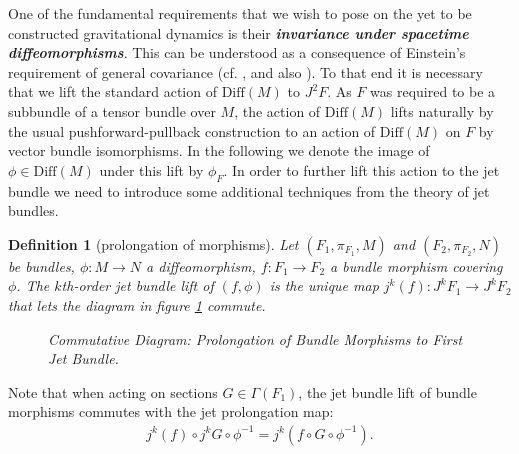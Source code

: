 \documentclass[%
 reprint,
nofootinbib,
 amsmath,amssymb,
 aps,
 prd,
floatfix,
]{revtex4-2}
\newtheorem{definition}{Definition}
\begin{document}
One of the fundamental requirements that we wish to pose on the yet to be constructed gravitational dynamics is their \textit{\textbf{invariance under spacetime diffeomorphisms}}. 
This can be understood as a consequence of Einstein's requirement of general covariance (cf. \cite{Stachel1993-STATMO-5}, \cite{Pooley} and also \cite{Norton1993-NORGCA}).
To that end it is necessary that we lift the standard action of $\mathrm{Diff}(M)$ to $J^2F$.
As $F$ was required to be a subbundle of a tensor bundle over $M$, the action of $\mathrm{Diff}(M)$ lifts naturally by the usual pushforward-pullback construction to an action of $\mathrm{Diff}(M)$ on $F$ by vector bundle isomorphisms.
In the following we denote the image of $\phi \in \mathrm{Diff}(M)$ under this lift by $\phi_F$.
In order to further lift this action to the jet bundle we need to introduce some additional techniques from the theory of jet bundles.
\begin{definition}[prolongation of morphisms]
Let $(F_1,\pi_{F_1},M)$ and $(F_2,\pi_{F_2},N)$ be bundles, $\phi : M \rightarrow N$ a diffeomorphism, $f : F_1 \rightarrow F_2$ a bundle morphism covering $\phi$. The $k$th-order jet bundle lift of $(f,\phi)$ is the unique  map $j^k(f):J^kF_1 \rightarrow J^kF_2$ that lets the diagram in figure \ref{ProlongMorph} commute.
\begin{figure}[hbt!]
\centering
{}
\caption{Commutative Diagram: Prolongation of Bundle Morphisms to First Jet Bundle.}\label{ProlongMorph}
\end{figure}
\end{definition}
Note that when acting on sections $G \in \Gamma(F_1)$, the jet bundle lift of bundle morphisms commutes with the jet prolongation map:
\begin{align}
j^k(f) \circ j^kG \circ \phi^{-1} = j^k \left (
f \circ G \circ \phi^{-1} \right ).
\end{align}
\end{document}
